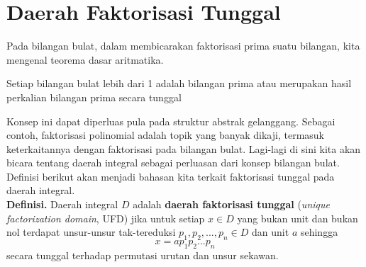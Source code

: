 	\section{Daerah Faktorisasi Tunggal}
	Pada bilangan bulat, dalam membicarakan faktorisasi prima suatu bilangan, kita mengenal teorema dasar aritmatika.
	\begin{theorem}
		Setiap bilangan bulat lebih dari 1 adalah bilangan prima atau merupakan hasil perkalian bilangan prima secara tunggal
	\end{theorem}
	Konsep ini dapat diperluas pula pada struktur abstrak gelanggang. Sebagai contoh, faktorisasi polinomial adalah topik yang banyak dikaji, termasuk keterkaitannya dengan faktorisasi pada bilangan bulat. Lagi-lagi di sini kita akan bicara tentang daerah integral sebagai perluasan dari konsep bilangan bulat. Definisi berikut akan menjadi bahasan kita terkait faktorisasi tunggal pada daerah integral.\\
	
	\textbf{Definisi.} Daerah integral $D$ adalah \textbf{daerah faktorisasi tunggal} (\textit{unique factorization domain}, UFD) jika untuk setiap $x \in D$ yang bukan unit dan bukan nol terdapat unsur-unsur tak-tereduksi $p_1, p_2, ..., p_n \in D$ dan unit $a$ sehingga $$x = ap_1p_2...p_n$$ secara tunggal terhadap permutasi urutan dan unsur sekawan.\\
	
